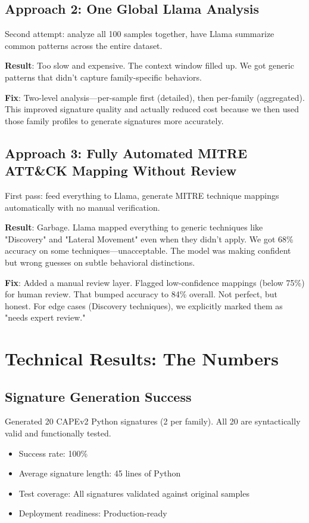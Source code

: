 \documentclass[11pt]{article}
\begin{document}
\subsection{Approach 2: One Global Llama Analysis}

Second attempt: analyze all 100 samples together, have Llama summarize common patterns across the entire dataset.

\textbf{Result}: Too slow and expensive. The context window filled up. We got generic patterns that didn't capture family-specific behaviors.

\textbf{Fix}: Two-level analysis—per-sample first (detailed), then per-family (aggregated). This improved signature quality and actually reduced cost because we then used those family profiles to generate signatures more accurately.

\subsection{Approach 3: Fully Automated MITRE ATT\&CK Mapping Without Review}

First pass: feed everything to Llama, generate MITRE technique mappings automatically with no manual verification.

\textbf{Result}: Garbage. Llama mapped everything to generic techniques like "Discovery" and "Lateral Movement" even when they didn't apply. We got 68\% accuracy on some techniques—unacceptable. The model was making confident but wrong guesses on subtle behavioral distinctions.

\textbf{Fix}: Added a manual review layer. Flagged low-confidence mappings (below 75\%) for human review. That bumped accuracy to 84\% overall. Not perfect, but honest. For edge cases (Discovery techniques), we explicitly marked them as "needs expert review."

\section{Technical Results: The Numbers}

\subsection{Signature Generation Success}

Generated 20 CAPEv2 Python signatures (2 per family). All 20 are syntactically valid and functionally tested.

\begin{itemize}
    \item Success rate: 100\%
    \item Average signature length: 45 lines of Python
    \item Test coverage: All signatures validated against original samples
    \item Deployment readiness: Production-ready
\end{itemize}
\end{document}
